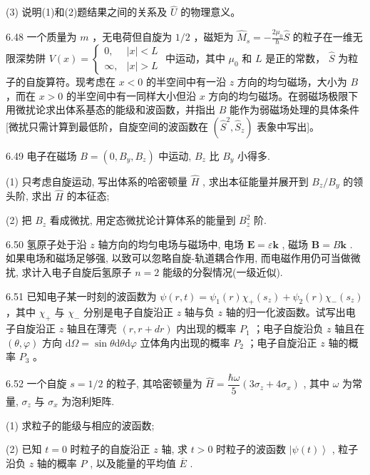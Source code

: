 (3) 说明(1)和(2)题结果之间的关系及 $\hat{U}$ 的物理意义。

\vfill\newpage

6.48 一个质量为 $m$ ，无电荷但自旋为 $1/2$ ，磁矩为 $\hat{M}_s = -\frac{2\mu_0}{\hbar}\hat{S}$ 的粒子在一维无限深势阱 $V(x) = \begin{cases} 0, & |x| < L \\ \infty, & |x| > L \end{cases}$ 中运动，其中 $\mu_0$ 和 $L$ 是正的常数， $\hat{S}$ 为粒子的自旋算符。现考虑在 $x < 0$ 的半空间中有一沿 $z$ 方向的均匀磁场，大小为 $B$ ，而在 $x > 0$ 的半空间中有一同样大小但沿 $x$ 方向的均匀磁场。在弱磁场极限下用微扰论求出体系基态的能级和波函数，并指出 $B$ 能作为弱磁场处理的具体条件[微扰只需计算到最低阶，自旋空间的波函数在 $(\hat{S}^2, \hat{S}_z)$ 表象中写出]。

\vfill\newpage

6.49 电子在磁场 $B = (0, B_y, B_z)$ 中运动, $B_z$ 比 $B_y$ 小得多. 

(1) 只考虑自旋运动, 写出体系的哈密顿量 $\hat{H}$ , 求出本征能量并展开到 $B_z / B_y$ 的领头阶, 求出 $\hat{H}$ 的本征态; 

(2) 把 $B_z$ 看成微扰, 用定态微扰论计算体系的能量到 $B_z^2$ 阶.

\vfill\newpage

6.50 氢原子处于沿 $z$ 轴方向的均匀电场与磁场中, 电场 $\pmb{E} = \varepsilon \pmb{k}$ , 磁场 $\pmb{B} = B\pmb{k}$ . 如果电场和磁场足够强, 以致可以忽略自旋-轨道耦合作用, 而电磁作用仍可当做微扰, 求计入电子自旋后氢原子 $n = 2$ 能级的分裂情况(一级近似).

\vfill\newpage

6.51 已知电子某一时刻的波函数为 $\psi(r, t) = \psi_1(r)\chi_+(s_z) + \psi_2(r)\chi_-(s_z)$ ，其中 $\chi_+$ 与 $\chi_-$ 分别是电子自旋沿正 $z$ 轴与负 $z$ 轴的归一化波函数。试写出电子自旋沿正 $z$ 轴且在薄壳 $(r, r + dr)$ 内出现的概率 $P_1$ ；电子自旋沿负 $z$ 轴且在 $(\theta, \varphi)$ 方向 $\mathrm{d}\Omega = \sin \theta \mathrm{d}\theta \mathrm{d}\varphi$ 立体角内出现的概率 $P_2$ ；电子自旋沿正 $z$ 轴的概率 $P_3$ 。

\vfill\newpage

6.52 一个自旋 $s = 1 / 2$ 的粒子, 其哈密顿量为 $\hat{H} = \dfrac{\hbar\omega}{5}(3\sigma_z + 4\sigma_x)$ , 其中 $\omega$ 为常量, $\sigma_z$ 与 $\sigma_x$ 为泡利矩阵. 

(1) 求粒子的能级与相应的波函数; 

(2) 已知 $t = 0$ 时粒子的自旋沿正 $z$ 轴, 求 $t > 0$ 时粒子的波函数 $\left|\psi(t)\right\rangle$ , 粒子沿负 $z$ 轴的概率 $P$ , 以及能量的平均值 $\overline{E}$ .


